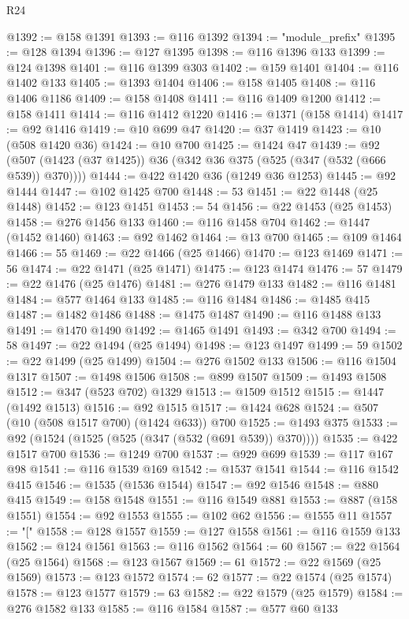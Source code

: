 \begin{lexlean}{R24}
\begin{coremodule}
{{{{{{{{{{{{{{{{{{{{{{{{{{{{{{{{{{{{{{{{{{{{{{{{{{{{{{{{{{{{{{{{{{{{{{{{{{{{{{{{{{{{{{{{{{{{{{{{{{{{{{{{{{{{{{{{{{{{{{{{{{{{{{{{{{{{{{{{{{{{{{{{{{{{{{{{{{{{{{{{{{{{{{{{{{{{{{{{{{{{{{{{{{{{{{{{{{{@1392 := @158 @1391
@1393 := @116 @1392
@1394 := "module_prefix"
@1395 := @128 @1394
@1396 := @127 @1395
@1398 := @116 @1396 @133
@1399 := @124 @1398
@1401 := @116 @1399 @303
@1402 := @159 @1401
@1404 := @116 @1402 @133
@1405 := @1393 @1404
@1406 := @158 @1405
@1408 := @116 @1406 @1186
@1409 := @158 @1408
@1411 := @116 @1409 @1200
@1412 := @158 @1411
@1414 := @116 @1412 @1220
@1416 := @1371 (@158 @1414)
@1417 := @92 @1416
@1419 := @10 @699 @47
@1420 := @37 @1419
@1423 := @10 (@508 @1420 @36)
@1424 := @10 @700
@1425 := @1424 @47
@1439 := @92 (@507 (@1423 (@37 @1425)) @36 (@342 @36 @375 (@525 (@347 (@532 (@666 @539)) @370))))
@1444 := @422 @1420 @36 (@1249 @36 @1253)
@1445 := @92 @1444
@1447 := @102 @1425 @700
@1448 := 53
@1451 := @22 @1448 (@25 @1448)
@1452 := @123 @1451
@1453 := 54
@1456 := @22 @1453 (@25 @1453)
@1458 := @276 @1456 @133
@1460 := @116 @1458 @704
@1462 := @1447 (@1452 @1460)
@1463 := @92 @1462
@1464 := @13 @700
@1465 := @109 @1464
@1466 := 55
@1469 := @22 @1466 (@25 @1466)
@1470 := @123 @1469
@1471 := 56
@1474 := @22 @1471 (@25 @1471)
@1475 := @123 @1474
@1476 := 57
@1479 := @22 @1476 (@25 @1476)
@1481 := @276 @1479 @133
@1482 := @116 @1481
@1484 := @577 @1464 @133
@1485 := @116 @1484
@1486 := @1485 @415
@1487 := @1482 @1486
@1488 := @1475 @1487
@1490 := @116 @1488 @133
@1491 := @1470 @1490
@1492 := @1465 @1491
@1493 := @342 @700
@1494 := 58
@1497 := @22 @1494 (@25 @1494)
@1498 := @123 @1497
@1499 := 59
@1502 := @22 @1499 (@25 @1499)
@1504 := @276 @1502 @133
@1506 := @116 @1504 @1317
@1507 := @1498 @1506
@1508 := @899 @1507
@1509 := @1493 @1508
@1512 := @347 (@523 @702) @1329
@1513 := @1509 @1512
@1515 := @1447 (@1492 @1513)
@1516 := @92 @1515
@1517 := @1424 @628
@1524 := @507 (@10 (@508 @1517 @700) (@1424 @633)) @700
@1525 := @1493 @375
@1533 := @92 (@1524 (@1525 (@525 (@347 (@532 (@691 @539)) @370))))
@1535 := @422 @1517 @700
@1536 := @1249 @700
@1537 := @929 @699
@1539 := @117 @167 @98
@1541 := @116 @1539 @169
@1542 := @1537 @1541
@1544 := @116 @1542 @415
@1546 := @1535 (@1536 @1544)
@1547 := @92 @1546
@1548 := @880 @415
@1549 := @158 @1548
@1551 := @116 @1549 @881
@1553 := @887 (@158 @1551)
@1554 := @92 @1553
@1555 := @102 @62
@1556 := @1555 @11
@1557 := "["
@1558 := @128 @1557
@1559 := @127 @1558
@1561 := @116 @1559 @133
@1562 := @124 @1561
@1563 := @116 @1562
@1564 := 60
@1567 := @22 @1564 (@25 @1564)
@1568 := @123 @1567
@1569 := 61
@1572 := @22 @1569 (@25 @1569)
@1573 := @123 @1572
@1574 := 62
@1577 := @22 @1574 (@25 @1574)
@1578 := @123 @1577
@1579 := 63
@1582 := @22 @1579 (@25 @1579)
@1584 := @276 @1582 @133
@1585 := @116 @1584
@1587 := @577 @60 @133
}}}}}}}}}}}}}}}}}}}}}}}}}}}}}}}}}}}}}}}}}}}}}}}}}}}}}}}}}}}}}}}}}}}}}}}}}}}}}}}}}}}}}}}}}}}}}}}}}}}}}}}}}}}}}}}}}}}}}}}}}}}}}}}}}}}}}}}}}}}}}}}}}}}}}}}}}}}}}}}}}}}}}}}}}}}}}}}}}}}}}}}}}}}}}}}}}}}
\end{coremodule}
\end{lexlean}
